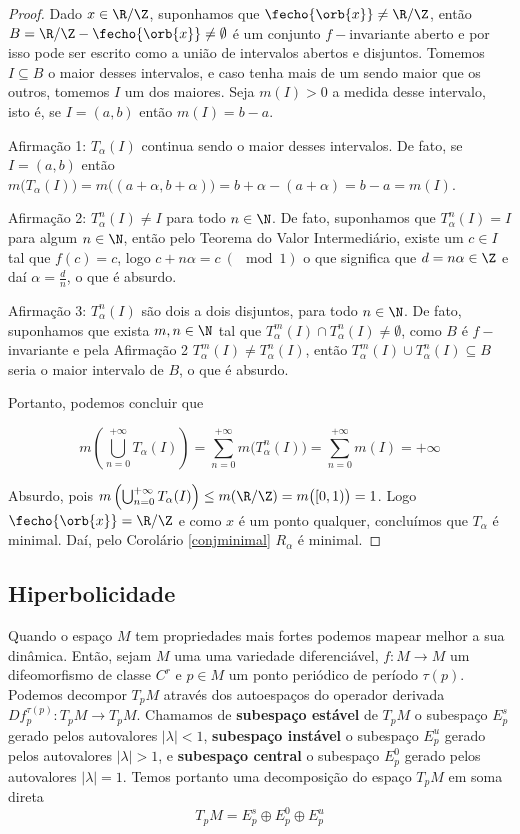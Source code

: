 \begin{proof} Dado $x\in\R/\Z$, suponhamos que $\fecho{\orb{x}}\neq\R/\Z$, então $B=\R/\Z-\fecho{\orb{x}}\neq\emptyset$ é um conjunto $f-$invariante aberto e por isso pode ser escrito como a união de intervalos abertos e disjuntos. Tomemos $I\subseteq B$ o maior desses intervalos, e caso tenha mais de um sendo maior que os outros, tomemos $I$ um dos maiores. Seja $m(I)>0$ a medida desse intervalo, isto é, se $I=(a,b)$ então $m(I)=b-a$.

Afirmação 1: $T_{\alpha}(I)$ continua sendo o maior desses intervalos. De fato, se $I=(a,b)$ então $m\big(T_{\alpha}(I)\big)=m\big((a+\alpha,b+\alpha)\big)=b+\alpha-(a+\alpha)=b-a=m(I)$. 

Afirmação 2: $T_{\alpha}^n(I)\neq I$ para todo $n\in\N$. De fato, suponhamos que $T_{\alpha}^n(I)=I$ para algum $n\in\N$, então pelo Teorema do Valor Intermediário, existe um $c\in I$ tal que $f(c)=c$, logo $c+n\alpha=c\ (\mod 1)$ o que significa que $d=n\alpha\in\Z$ e daí $\alpha=\frac{d}{n}$, o que é absurdo.

Afirmação 3: $T_{\alpha}^n(I)$ são dois a dois disjuntos, para todo $n\in\N$. De fato, suponhamos que exista $m,n\in\N$ tal que $T_{\alpha}^m(I)\cap T_{\alpha}^n(I)\neq\emptyset$, como $B$ é $f-$invariante e pela Afirmação 2 $T_{\alpha}^m(I)\neq T_{\alpha}^n(I)$, então $T_{\alpha}^m(I)\cup T_{\alpha}^n(I)\subseteq B$ seria o maior intervalo de $B$, o que é absurdo.

Portanto, podemos concluir que 

\begin{equation*}
m\left(\bigcup_{n=0}^{+\infty}T_{\alpha}(I)\right)=\sum_{n=0}^{+\infty}m\big(T_{\alpha}^n(I)\big)=\sum_{n=0}^{+\infty}m(I)=+\infty
\end{equation*}

Absurdo, pois $m\left(\bigcup_{n=0}^{+\infty}T_{\alpha}(I)\right)\leq m(\R/\Z)=m\big([0,1)\big)=1$. Logo $\fecho{\orb{x}}=\R/\Z$ e como $x$ é um ponto qualquer, concluímos que $T_{\alpha}$ é minimal. Daí, pelo Corolário \ref{conjminimal} $R_{\alpha}$ é minimal.
\end{proof}


\subsection{Hiperbolicidade}

Quando o espaço $M$ tem propriedades mais fortes podemos mapear melhor a sua dinâmica. Então, sejam $M$ uma uma variedade diferenciável, $f:M\to M$ um difeomorfismo de classe $C^r$ e $p\in M$ um ponto periódico de período $\tau(p)$. Podemos decompor $T_pM$ através dos autoespaços do operador derivada $Df_p^{\tau(p)}:T_pM\to T_{p}M$. Chamamos de \textbf{subespaço estável} de $T_pM$ o subespaço $E_p^s$ gerado pelos autovalores $|\lambda|<1$, \textbf{subespaço instável} o subespaço $E_p^u$ gerado pelos autovalores $|\lambda|>1$, e \textbf{subespaço central} o subespaço $E_p^0$ gerado pelos autovalores $|\lambda|=1$. Temos portanto uma decomposição do espaço $T_pM$ em soma direta
\begin{equation*}
T_pM=E_p^s\oplus E_p^0\oplus E_p^u
\end{equation*}

